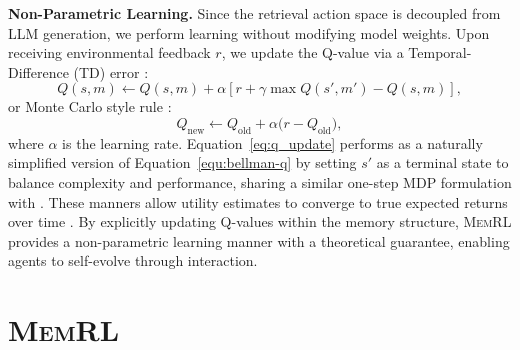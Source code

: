 \documentclass{article}
\theoremstyle{plain}
\theoremstyle{definition}
\theoremstyle{remark}
\begin{document}
\textbf{Non-Parametric Learning.} Since the retrieval action space is decoupled from LLM generation, we perform learning without modifying model weights. Upon receiving environmental feedback $r$, we update the Q-value via a Temporal-Difference (TD) error \citep{sutton1988learning}:
\begin{equation}
\label{equ:bellman-q}
    Q(s,m) \leftarrow Q(s,m) + \alpha [r + \gamma \max Q(s',m') - Q(s,m)],
\end{equation}
or Monte Carlo style rule \citep{metropolis1949monte}:
\begin{equation}
\label{eq:q_update}
Q_{\text{new}} \leftarrow Q_{\text{old}} + \alpha \big(r - Q_{\text{old}}\big),
\end{equation}
where $\alpha$ is the learning rate. Equation~\ref{eq:q_update} performs as a naturally simplified version of Equation~\ref{equ:bellman-q} by setting $s'$ as a terminal state to balance complexity and performance, sharing a similar one-step MDP formulation with \citet{guo2025deepseek}. These manners allow utility estimates to converge to true expected returns over time \citep{bellman1966dynamic}. By explicitly updating Q-values within the memory structure, \textsc{MemRL} provides a non-parametric learning manner with a theoretical guarantee, enabling agents to self-evolve through interaction.

\section{\textsc{MemRL}}
\label{sec:method}

\end{document}
